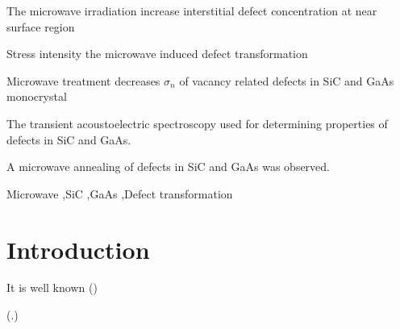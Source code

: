 \documentclass[final,3p,times,twocolumn,authoryear]{elsarticle}
\begin{document}
\begin{frontmatter}

\begin{highlights}
\item
The microwave irradiation increase interstitial defect concentration at near surface region

\item
Stress intensity the microwave induced defect transformation

\item
Microwave treatment decreases $\sigma_n$ of vacancy related defects in SiC and GaAs monocrystal

\item
The transient acoustoelectric spectroscopy used for determining properties of defects in SiC and GaAs.

\item
A microwave annealing of defects in SiC and GaAs was observed.
\end{highlights}

\begin{keyword}
Microwave
\sep SiC
\sep GaAs
\sep Defect transformation
\end{keyword}

\end{frontmatter}


\section{Introduction}\label{sec1}



It is well known (\cite{KozlovsEn,RadiationEffectsBook})

(\cite{MW:Rev,ZOHM2000,BHUNIA1998,Bacherikov2003En,Pashkov1994En,
BoltovetsEn,Milenin1994En,BelyaevIntac,ASHKINADZE1996,ProcSPIE,Belyaev1998JTFEn,
Bacherikov2008En,Konakova2015En,Konakova2012FTPEn}.)


 \cite{MW:Rev,ZOHM2000}
\end{document}
